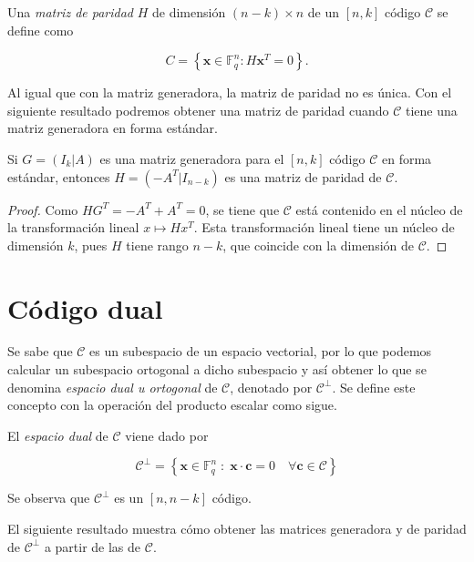 \begin{definition}
    Una \emph{matriz de paridad} $H$ de dimensión $(n-k) \times n$ de un $\left[ n,k \right]$ código $\mathcal{C}$ se define como

    $$C = \left\lbrace \mathbf{x} \in \mathbb{F} _q^n : H\mathbf{x}^T = 0 \right\rbrace .$$
\end{definition}

Al igual que con la matriz generadora, la matriz de paridad no es única. Con el siguiente resultado podremos obtener una matriz de paridad cuando $\mathcal{C}$ tiene una matriz generadora en forma estándar.

\begin{theorem}
    Si $G = \left( I_k | A \right)$ es una matriz generadora para el $\left[ n,k \right]$ código $\mathcal{C}$ en forma estándar, entonces $H = \left( -A^T | I_{n-k} \right)$ es una matriz de paridad de $\mathcal{C}$.
\end{theorem}

\begin{proof}
    Como $HG^T = -A^T + A^T = 0$, se tiene que $\mathcal{C}$ está contenido en el núcleo de la transformación lineal $x \mapsto Hx^T$. Esta transformación lineal tiene un núcleo de dimensión $k$, pues $H$ tiene rango $n-k$, que coincide con la dimensión de $\mathcal{C}$.
\end{proof}

\section{Código dual}

Se sabe que $\mathcal{C}$ es un subespacio de un espacio vectorial, por lo que podemos calcular un subespacio ortogonal a dicho subespacio y así obtener lo que se denomina \emph{espacio dual u ortogonal} de $\mathcal{C}$, denotado por $\mathcal{C} ^{\perp}$. Se define este concepto con la operación del producto escalar como sigue.

\begin{definition}
    El \emph{espacio dual} de $\mathcal{C}$ viene dado por 
    
    $$\mathcal{C} ^{\perp} = \left\{ \mathbf{x} \in \mathbb{F}_q^n \; : \; \mathbf{x} \cdot \mathbf{c} = 0 \quad \forall \mathbf{c} \in \mathcal{C} \right\}$$
\end{definition}

Se observa que $\mathcal{C} ^{\perp}$ es un $[n,n-k]$ código.

El siguiente resultado muestra cómo obtener las matrices generadora y de paridad de $\mathcal{C} ^{\perp}$ a partir de las de $\mathcal{C}$.

